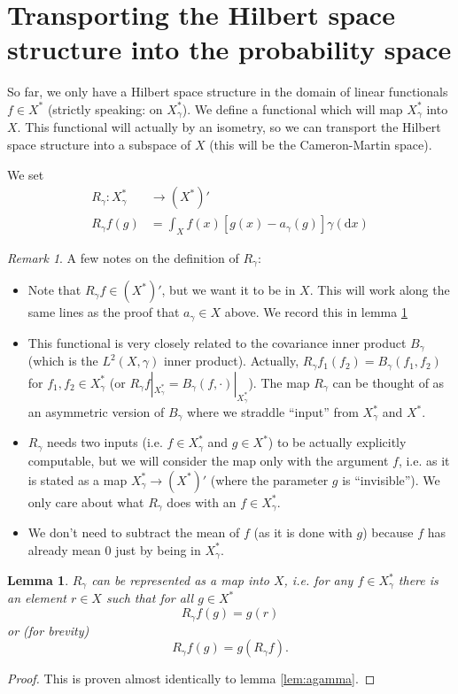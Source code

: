 \documentclass{scrartcl}
\newtheorem{lemma}{Lemma}
\theoremstyle{definition}
\theoremstyle{remark}
\newtheorem{remark}{Remark}
\newcommand{\de}{\mathrm d}
\begin{document}
\section{Transporting the Hilbert space structure into the probability space}
So far, we only have a Hilbert space structure in the domain of linear functionals $f\in X^*$ (strictly speaking: on $X_\gamma^*$). We define a functional which will map $X_\gamma^*$ into $X$. This functional will actually by an isometry, so we can transport the Hilbert space structure into a subspace of $X$ (this will be the Cameron-Martin space).

We set
\begin{align*}
R_\gamma : X_\gamma^* & \to (X^*)'\\
R_\gamma f (g) &= \int_X f(x) [g(x)-a_\gamma(g)]\gamma(\de x)
\end{align*}
\begin{remark}
A few notes on the definition of $R_\gamma$:
\begin{itemize}
\item Note that $R_\gamma f \in (X^*)'$, but we want it to be in $X$. This will work along the same lines as the proof that $a_\gamma\in X$ above. We record this in lemma \ref{lem:Rgamma}
\item This functional is very closely related to the covariance inner product $B_\gamma$ (which is the $L^2(X, \gamma)$ inner product). Actually, $R_\gamma f_1 (f_2) = B_\gamma (f_1, f_2)$ for $f_1, f_2\in X_\gamma^*$ (or $R_\gamma f|_{X_\gamma^*} = B_\gamma(f, \cdot)|_{X_\gamma^*}$). The map $R_\gamma$ can be thought of as an asymmetric version of $B_\gamma$ where we straddle ``input'' from $X_\gamma^*$ and $X^*$.
\item $R_\gamma$ needs two inputs (i.e. $f\in X_\gamma^*$ and $g\in X^*$) to be actually explicitly computable, but we will consider the map only with the argument $f$, i.e. as it is stated as a map $X_\gamma^* \to (X^*)'$ (where the parameter $g$ is ``invisible''). We only care about what $R_\gamma$ does with an $f\in X_\gamma^*$.
\item  We don't need to subtract the mean of $f$ (as it is done with $g$) because $f$ has already mean $0$ just by being in $X_\gamma^*$.
\end{itemize}
\end{remark}
\begin{lemma}\label{lem:Rgamma}
$R_\gamma$ can be represented as a map into $X$, i.e. for any $f\in X_\gamma^*$ there is an element $r\in X$ such that for all $g\in X^*$
\[R_\gamma f(g) = g(r)\]
or (for brevity)
\[R_\gamma f(g) = g(R_\gamma f).\]
\end{lemma}
\begin{proof}
This is proven almost identically to lemma \ref{lem:agamma}.
\end{proof}
\end{document}
